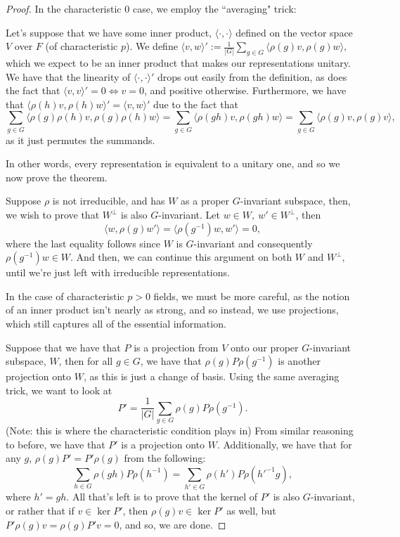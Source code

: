 \documentclass{article}
\begin{document}
\begin{proof}

In the characteristic $0$ case, we employ the ``averaging" trick:

Let's suppose that we have some inner product, $\langle \cdot , \cdot \rangle$ defined on the vector space $V$ over $F$ (of characteristic $p$). We define $\langle v, w \rangle' := \frac{1}{|G|} \sum_{g \in G} \langle \rho(g)v , \rho(g)w \rangle,$ which we expect to be an inner product that makes our representations unitary. We have that the linearity of $\langle \cdot, \cdot \rangle '$ drops out easily from the definition, as does the fact that $\langle v,v \rangle' = 0 \iff v = 0$, and positive otherwise. Furthermore, we have that $\langle \rho(h)v, \rho(h)w \rangle' = \langle v, w \rangle'$ due to the fact that $$\sum_{g \in G} \langle \rho(g)\rho(h)v, \rho(g)\rho(h)w \rangle = \sum_{g \in G} \langle \rho(gh)v, \rho(gh)w \rangle = \sum_{g \in G} \langle \rho(g)v, \rho(g)v\rangle,$$ as it just permutes the summands.

In other words, every representation is equivalent to a unitary one, and so we now prove the theorem.

Suppose $\rho$ is not irreducible, and has $W$ as a proper $G$-invariant subspace, then, we wish to prove that $W^\perp$ is also $G$-invariant. Let $w \in W, \ w' \in W^\perp$, then $$\langle w, \rho(g)w' \rangle = \langle \rho(g^{-1})w, w' \rangle  = 0,$$ where the last equality follows since $W$ is $G$-invariant and consequently $\rho(g^{-1})w \in W$. And then, we can continue this argument on both $W$ and $W^\perp,$ until we're just left with irreducible representations.

In the case of characteristic $p>0$ fields, we must be more careful, as the notion of an inner product isn't nearly as strong, and so instead, we use projections, which still captures all of the essential information.

Suppose that we have that $P$ is a projection from $V$ onto our proper $G$-invariant subspace, $W$, then for all $g \in G$, we have that $\rho(g)P\rho(g^{-1})$ is another projection onto $W$, as this is just a change of basis. Using the same averaging trick, we want to look at $$P' = \frac{1}{|G|} \sum_{g \in G} \rho(g)P\rho(g^{-1}).$$ (Note: this is where the characteristic condition plays in) From similar reasoning to before, we have that $P'$ is a projection onto $W$. Additionally, we have that for any $g$, $\rho(g)P'=P'\rho(g)$ from the following:
$$ \sum_{h \in G} \rho(gh)P\rho(h^{-1}) = \sum_{h' \in G} \rho(h')P\rho(h'^{-1}g),$$ where $h' = gh$. All that's left is to prove that the kernel of $P'$ is also $G$-invariant, or rather that if $v \in \ker P'$, then $\rho(g)v \in \ker P'$ as well, but $P'\rho(g)v = \rho(g)P'v=0$, and so, we are done.

\end{proof}
\end{document}

